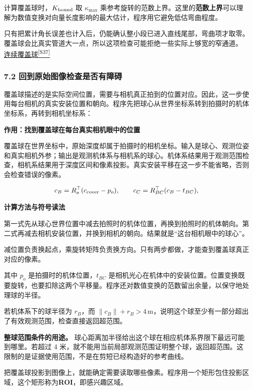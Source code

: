 \documentclass[12pt,a4paper]{article}
\numberwithin{equation}{topic}
\newcommand{\sourceref}[2]{\hyperlink{source-#1}{#2\textsuperscript{[#1]}}}
\begin{document}
计算覆盖球时，\(K_{\rm bound}\) 取 \(\kappa_{\max}\) 乘参考旋转的范数上界。这里的\textbf{范数上界}可以理解为数值变换对向量长度影响的最大估计，程序用它避免低估弯曲程度。

只有把累计角长误差也计入后，仍能确认整小段已进入直线尾部，弯曲项才取零。覆盖球会比真实管道大一点，所以这项检查可能拒绝一些实际上够宽的窄通道。 \sourceref{S37}{连续覆盖球}

\subsubsection*{7.2 回到原始图像检查是否有障碍}

覆盖球描述的是实际空间位置，需要与相机真正拍到的位置对应。因此，这一步使用每台相机的真实安装位置和朝向。程序先把球心从世界坐标系转到拍摄时的机体坐标系，再转到相机坐标系：

\noindent\textbf{作用：找到覆盖球在每台真实相机眼中的位置}\par\nobreak
覆盖球在世界坐标中，原始深度却属于拍摄时的相机坐标。输入是球心、观测位姿和真实相机外参；输出是观测机体系与相机系的球心。机体系结果用于观测范围检查，相机系结果用于深度区间和像素投影。真实安装平移在这一步不能省略，否则会检查错误的像素。

\begin{equation}
\label{eq:frames}
c_B=R_o^\top(c_{\rm cover}-p_o),\qquad
c_C=R_{BC}^\top(c_B-t_{BC}),
\end{equation}

\noindent\textbf{计算方法与符号读法}\par\nobreak
第一式先从球心世界位置中减去拍照时的机体位置，再换到拍照时的机体朝向。第二式再减去相机安装位置，并换到相机的朝向。结果就是“这台相机眼中的球心”。

减位置负责换起点，乘旋转矩阵负责换方向。只有两步都做，才能查到覆盖球真正对应的像素。


其中 \(p_o\) 是拍摄时的机体位置，\(t_{BC}\) 是相机光心在机体中的安装位置。位置变换既要旋转，也要扣除这两个平移量。程序还对数值变换的范数留出余量，以保守地处理球的半径。

若机体系下的球半径为 \(r_B\)，而 \(\|c_B\|+r_B>4\,\mathrm m\)，说明这个球至少有一部分超出了有效观测范围，检查直接返回超范围。

\textbf{整球范围条件的用途。} 球心距离加半径给出这个球在相应机体系界限下最远可能到哪里。若超过 4 米，就不能用当前局部观测范围证明整个球，返回超范围。这限制的是证据使用范围，不是在剪短已经构造好的参考曲线。

把覆盖球投影到图像上，就能确定需要读取哪些像素。程序用一个矩形包住投影区域，这个矩形称为\textbf{ROI}，即感兴趣区域。
\end{document}
